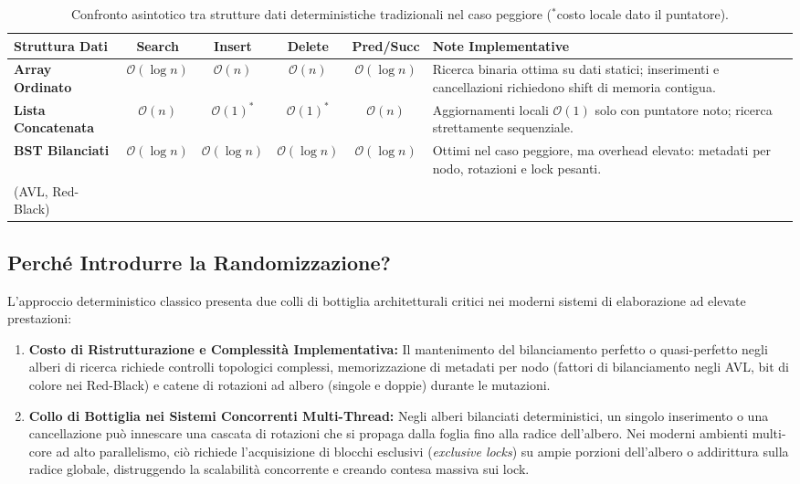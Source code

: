 \begin{table}[H]
\centering
\footnotesize
\setlength{\tabcolsep}{3.5pt}
\begin{tabularx}{\textwidth}{@{}lccccY@{}}
\toprule
\textbf{Struttura Dati} & \textbf{Search} & \textbf{Insert} & \textbf{Delete} & \textbf{Pred/Succ} & \textbf{Note Implementative} \\
\midrule
\textbf{Array Ordinato} & $\mathcal{O}(\log n)$ & $\mathcal{O}(n)$ & $\mathcal{O}(n)$ & $\mathcal{O}(\log n)$ & Ricerca binaria ottima su dati statici; inserimenti e cancellazioni richiedono shift di memoria contigua. \\
\addlinespace
\textbf{Lista Concatenata} & $\mathcal{O}(n)$ & $\mathcal{O}(1)^*$ & $\mathcal{O}(1)^*$ & $\mathcal{O}(n)$ & Aggiornamenti locali $\mathcal{O}(1)$ solo con puntatore noto; ricerca strettamente sequenziale. \\
\addlinespace
\textbf{BST Bilanciati} & $\mathcal{O}(\log n)$ & $\mathcal{O}(\log n)$ & $\mathcal{O}(\log n)$ & $\mathcal{O}(\log n)$ & Ottimi nel caso peggiore, ma overhead elevato: metadati per nodo, rotazioni e lock pesanti. \\
(AVL, Red-Black) & & & & & \\
\bottomrule
\end{tabularx}
\caption{Confronto asintotico tra strutture dati deterministiche tradizionali nel caso peggiore ($^*$costo locale dato il puntatore).}
\label{tab:deterministic-dictionary-comparison}
\end{table}

\FloatBarrier
\subsection{Perché Introdurre la Randomizzazione?}
L'approccio deterministico classico presenta due colli di bottiglia architetturali critici nei moderni sistemi di elaborazione ad elevate prestazioni:
\begin{enumerate}
  \item \textbf{Costo di Ristrutturazione e Complessità Implementativa:} Il mantenimento del bilanciamento perfetto o quasi-perfetto negli alberi di ricerca richiede controlli topologici complessi, memorizzazione di metadati per nodo (fattori di bilanciamento negli AVL, bit di colore nei Red-Black) e catene di rotazioni ad albero (singole e doppie) durante le mutazioni.
  \item \textbf{Collo di Bottiglia nei Sistemi Concorrenti Multi-Thread:} Negli alberi bilanciati deterministici, un singolo inserimento o una cancellazione può innescare una cascata di rotazioni che si propaga dalla foglia fino alla radice dell'albero. Nei moderni ambienti multi-core ad alto parallelismo, ciò richiede l'acquisizione di blocchi esclusivi (\textit{exclusive locks}) su ampie porzioni dell'albero o addirittura sulla radice globale, distruggendo la scalabilità concorrente e creando contesa massiva sui lock.
\end{enumerate}

